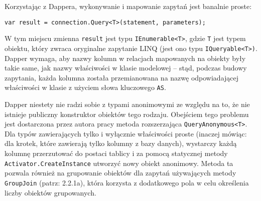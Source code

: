 \pagebreak

Korzystając z Dappera, wykonywanie i mapowanie zapytań jest banalnie proste:

\begin{lstlisting}
var result = connection.Query<T>(statement, parameters);
\end{lstlisting}

W tym miejscu zmienna \texttt{result} jest typu \texttt{IEnumerable<T>}, gdzie \texttt{T} jest typem obiektu, który zwraca oryginalne zapytanie LINQ (jest ono typu \texttt{IQueryable<T>)}. Dapper wymaga, aby nazwy kolumn w relacjach mapowanych na obiekty były takie same, jak nazwy właściwości w klasie modelowej – stąd, podczas budowy zapytania, każda kolumna została przemianowana na nazwę odpowiadającej właściwości w klasie z użyciem słowa kluczowego \texttt{AS}.

Dapper niestety nie radzi sobie z typami anonimowymi ze względu na to, że nie istnieje publiczny konstruktor obiektów tego rodzaju. Obejściem tego problemu jest dostarczona przez autora pracy metoda rozszerzająca \texttt{QueryAnonymous<T>}. Dla typów zawierających tylko i wyłącznie właściwości proste (inaczej mówiąc: dla krotek, które zawierają tylko kolumny z bazy danych), wystarczy każdą kolumnę przerzutować do postaci tablicy i za pomocą statycznej metody \texttt{Activator.CreateInstance} utworzyć nowy obiekt anonimowy. Metoda ta pozwala również na grupowanie obiektów dla zapytań używających metody \texttt{GroupJoin} (patrz: 2.2.1a), która korzysta z dodatkowego pola w celu określenia liczby obiektów grupowanych.